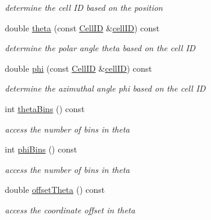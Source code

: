 \begin{DoxyCompactItemize}
\begin{DoxyCompactList}\small\item\em determine the cell ID based on the position \end{DoxyCompactList}\item 
double \hyperlink{class_d_d4hep_1_1_d_d_segmentation_1_1_projective_cylinder_ae910cdea40db4b821f9d49627be2833c}{theta} (const \hyperlink{namespace_d_d4hep_1_1_d_d_segmentation_ac7af071d85cb48820914434a07e21ba1}{Cell\+ID} \&\hyperlink{class_d_d4hep_1_1_d_d_segmentation_1_1_projective_cylinder_ab90f41be410f8fbdc86278b2d11060ee}{cell\+ID}) const
\begin{DoxyCompactList}\small\item\em determine the polar angle theta based on the cell ID \end{DoxyCompactList}\item 
double \hyperlink{class_d_d4hep_1_1_d_d_segmentation_1_1_projective_cylinder_afa8f12ff739a7cd9dfd980cf341ff5cd}{phi} (const \hyperlink{namespace_d_d4hep_1_1_d_d_segmentation_ac7af071d85cb48820914434a07e21ba1}{Cell\+ID} \&\hyperlink{class_d_d4hep_1_1_d_d_segmentation_1_1_projective_cylinder_ab90f41be410f8fbdc86278b2d11060ee}{cell\+ID}) const
\begin{DoxyCompactList}\small\item\em determine the azimuthal angle phi based on the cell ID \end{DoxyCompactList}\item 
int \hyperlink{class_d_d4hep_1_1_d_d_segmentation_1_1_projective_cylinder_aee8027e1d9b736465333bfb7baaf8145}{theta\+Bins} () const
\begin{DoxyCompactList}\small\item\em access the number of bins in theta \end{DoxyCompactList}\item 
int \hyperlink{class_d_d4hep_1_1_d_d_segmentation_1_1_projective_cylinder_a3ebe56442e3120fd1cd5a7ef3a8ad1ee}{phi\+Bins} () const
\begin{DoxyCompactList}\small\item\em access the number of bins in theta \end{DoxyCompactList}\item 
double \hyperlink{class_d_d4hep_1_1_d_d_segmentation_1_1_projective_cylinder_a84ae02838b7038e926a3354b83a59006}{offset\+Theta} () const
\begin{DoxyCompactList}\small\item\em access the coordinate offset in theta \end{DoxyCompactList}\item 

\end{DoxyCompactItemize}
